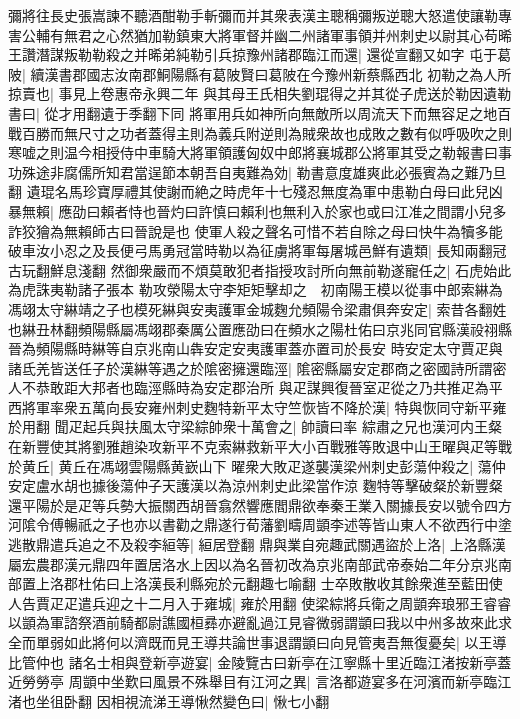 彌將往長史張嵩諫不聽酒酣勒手斬彌而并其衆表漢主聰稱彌叛逆聰大怒遣使讓勒專害公輔有無君之心然猶加勒鎮東大將軍督并幽二州諸軍事領并州刺史以尉其心苟晞王讚潛謀叛勒勒殺之并晞弟純勒引兵掠豫州諸郡臨江而還|{
	還從宣翻又如字}
屯于葛陂|{
	續漢書郡國志汝南郡鮦陽縣有葛陂賢曰葛陂在今豫州新蔡縣西北}
初勒之為人所掠賣也|{
	事見上卷惠帝永興二年}
與其母王氏相失劉琨得之并其從子虎送於勒因遺勒書曰|{
	從才用翻遺于季翻下同}
將軍用兵如神所向無敵所以周流天下而無容足之地百戰百勝而無尺寸之功者蓋得主則為義兵附逆則為賊衆故也成敗之數有似呼吸吹之則寒嘘之則温今相授侍中車騎大將軍領護匈奴中郎將襄城郡公將軍其受之勒報書曰事功殊途非腐儒所知君當逞節本朝吾自夷難為効|{
	勒書意度雄爽此必張賓為之難乃旦翻}
遺琨名馬珍寶厚禮其使謝而絶之時虎年十七殘忍無度為軍中患勒白母曰此兒凶暴無賴|{
	應劭曰賴者恃也晉灼曰許慎曰賴利也無利入於家也或曰江准之間謂小兒多詐狡獪為無賴師古曰晉說是也}
使軍人殺之聲名可惜不若自除之母曰快牛為犢多能破車汝小忍之及長便弓馬勇冠當時勒以為征虜將軍每屠城邑鮮有遺類|{
	長知兩翻冠古玩翻鮮息淺翻}
然御衆嚴而不煩莫敢犯者指授攻討所向無前勒遂寵任之|{
	石虎始此為虎誅夷勒諸子張本}
勒攻滎陽太守李矩矩擊却之　初南陽王模以從事中郎索綝為馮翊太守綝靖之子也模死綝與安夷護軍金城麴允頻陽令梁肅俱奔安定|{
	索昔各翻姓也綝丑林翻頻陽縣屬馮翊郡秦厲公置應劭曰在頻水之陽杜佑曰京兆同官縣漢祋祤縣晉為頻陽縣時綝等自京兆南山犇安定安夷護軍蓋亦置司於長安}
時安定太守賈疋與諸氐羌皆送任子於漢綝等遇之於隂密擁還臨涇|{
	隂密縣屬安定郡商之密國詩所謂密人不恭敢距大邦者也臨涇縣時為安定郡治所}
與疋謀興復晉室疋從之乃共推疋為平西將軍率衆五萬向長安雍州刺史麴特新平太守竺恢皆不降於漢|{
	特與恢同守新平雍於用翻}
聞疋起兵與扶風太守梁綜帥衆十萬會之|{
	帥讀曰率}
綜肅之兄也漢河内王粲在新豐使其將劉雅趙染攻新平不克索綝救新平大小百戰雅等敗退中山王曜與疋等戰於黄丘|{
	黄丘在馮翊雲陽縣黄嶔山下}
曜衆大敗疋遂襲漢梁州刺史彭蕩仲殺之|{
	蕩仲安定盧水胡也據後蕩仲子天護漢以為涼州刺史此梁當作涼}
麴特等擊破粲於新豐粲還平陽於是疋等兵勢大振關西胡晉翕然響應閻鼎欲奉秦王業入關據長安以號令四方河隂令傅暢祇之子也亦以書勸之鼎遂行荀藩劉疇周顗李述等皆山東人不欲西行中塗逃散鼎遣兵追之不及殺李絙等|{
	絙居登翻}
鼎與業自宛趣武關遇盜於上洛|{
	上洛縣漢屬宏農郡漢元鼎四年置居洛水上因以為名晉初改為京兆南部武帝泰始二年分京兆南部置上洛郡杜佑曰上洛漢長利縣宛於元翻趣七喻翻}
士卒敗散收其餘衆進至藍田使人告賈疋疋遣兵迎之十二月入于雍城|{
	雍於用翻}
使梁綜將兵衛之周顗奔琅邪王睿睿以顗為軍諮祭酒前騎都尉譙國桓彞亦避亂過江見睿微弱謂顗曰我以中州多故來此求全而單弱如此將何以濟既而見王導共論世事退謂顗曰向見管夷吾無復憂矣|{
	以王導比管仲也}
諸名士相與登新亭遊宴|{
	金陵覽古曰新亭在江寧縣十里近臨江渚按新亭蓋近勞勞亭}
周顗中坐歎曰風景不殊舉目有江河之異|{
	言洛都遊宴多在河濱而新亭臨江渚也坐徂卧翻}
因相視流涕王導愀然變色曰|{
	愀七小翻}
